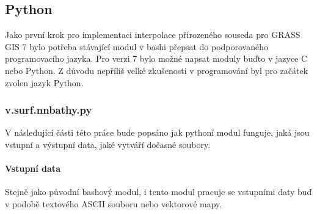 \documentclass[12pt,a4paper]{article}
\begin{document}

\newpage
\subsection{Python}
Jako první krok pro implementaci interpolace přirozeného souseda pro GRASS GIS 7 bylo potřeba stávající modul v bashi přepsat do podporovaného programovacího jazyka. Pro verzi 7 bylo možné napsat moduly buďto v jazyce C nebo Python. Z důvodu nepříliš velké zkušenosti v programování byl pro začátek zvolen jazyk Python.

\subsubsection{v.surf.nnbathy.py}

V následující části této práce bude popsáno jak pythoní modul funguje, jaká jsou vstupní a výstupní data, jaké vytváří dočasné soubory.

\paragraph{Vstupní data}
Stejně jako původní bashový modul, i tento modul pracuje se vstupními daty buď v podobě textového ASCII souboru nebo vektorové mapy. 
\end{document}
